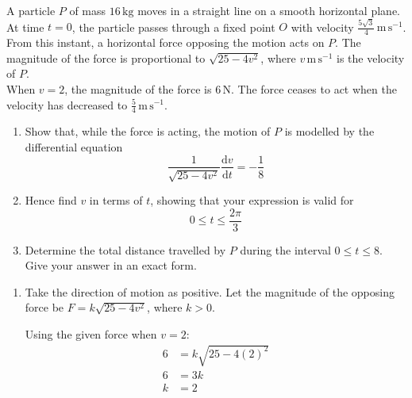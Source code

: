 \documentclass[leqno]{article}
\begin{document}
\begin{enumerate}[
  label=\textbf{\arabic*.},
  leftmargin=*,
  topsep=0pt,
  partopsep=0pt,
  parsep=0pt
]
\newpage

\questionitem

A particle $P$ of mass $16\,\mathrm{kg}$ moves in a straight line on a smooth horizontal plane. \\ 

At time $t=0$, the particle passes through a fixed point $O$ with velocity $\frac{5\sqrt{3}}{4}\,\mathrm{m\,s^{-1}}$. \\

From this instant, a horizontal force opposing the motion acts on $P$. The magnitude of the force is proportional to $\sqrt{25-4v^2}$, where $v\,\mathrm{m\,s^{-1}}$ is the velocity of $P$.  \\

When $v=2$, the magnitude of the force is $6\,\mathrm{N}$. The force ceases to act when the velocity has decreased to $\frac{5}{4}\,\mathrm{m\,s^{-1}}$. \\

\begin{enumerate}[label=\textbf{(\alph*)}]
  \item Show that, while the force is acting, the motion of $P$ is modelled by the differential equation
  \[
  \frac{1}{\sqrt{25-4v^2}}\frac{\mathrm{d}v}{\mathrm{d}t}=-\frac{1}{8}
  \]
  \item Hence find $v$ in terms of $t$, showing that your expression is valid for
  \[
  0\leq t\leq \frac{2\pi}{3}
  \]
  \item Determine the total distance travelled by $P$ during the interval $0\leq t\leq 8$. Give your answer in an exact form.  \\
\end{enumerate}

\vspace*{10pt}

\begin{djsSolution}
\begin{enumerate}[label=\textbf{(\alph*)}, start=1]
  \item Take the direction of motion as positive. Let the magnitude of the opposing force be \(F=k\sqrt{25-4v^2}\), where \(k>0\).

  Using the given force when \(v=2\):
  \begin{align*}
  6&=k\sqrt{25-4(2)^2}\\
  6&=3k\\
  k&=2
  \end{align*}


\end{enumerate}
\end{djsSolution}
\end{enumerate}
\end{document}
